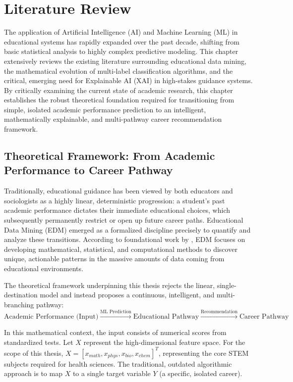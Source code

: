 \section{Literature Review}

The application of Artificial Intelligence (AI) and Machine Learning (ML) in educational systems has rapidly expanded over the past decade, shifting from basic statistical analysis to highly complex predictive modeling. This chapter extensively reviews the existing literature surrounding educational data mining, the mathematical evolution of multi-label \parencite{tsoumakas2007multi} classification algorithms, and the critical, emerging need for Explainable AI (XAI) in high-stakes guidance systems. By critically examining the current state of academic research, this chapter establishes the robust theoretical foundation required for transitioning from simple, isolated academic performance prediction to an intelligent, mathematically explainable, and multi-pathway career recommendation framework.

\subsection{Theoretical Framework: From Academic Performance to Career Pathway}

Traditionally, educational guidance has been viewed by both educators and sociologists as a highly linear, deterministic progression: a student's past academic performance dictates their immediate educational choices, which subsequently permanently restrict or open up future career paths. Educational Data Mining \parencite{romero2010educational} (EDM) emerged as a formalized discipline precisely to quantify and analyze these transitions. According to foundational work by \textcite{romero2010educational}, EDM focuses on developing mathematical, statistical, and computational methods to discover unique, actionable patterns in the massive amounts of data coming from educational environments.

The theoretical framework underpinning this thesis rejects the linear, single-destination model and instead proposes a continuous, intelligent, and multi-branching pathway:
\[
\text{Academic Performance (Input)} \xrightarrow{\text{ML Prediction}} \text{Educational Pathway} \xrightarrow{\text{Recommendation}} \text{Career Pathway}
\]

In this mathematical context, the input consists of numerical scores from standardized tests. Let $X$ represent the high-dimensional feature space. For the scope of this thesis, $X = [x_{math}, x_{phys}, x_{bio}, x_{chem}]^T$, representing the core STEM subjects required for health sciences. The traditional, outdated algorithmic approach is to map $X$ to a single target variable $Y$ (a specific, isolated career). 

